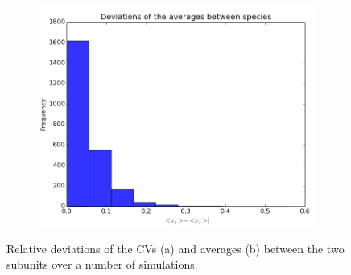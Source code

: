 \documentclass[a4paper,12pt]{article}
\begin{document}
\begin{figure}[!ht]
        \begin{subfigure}[b]{0.7\textwidth}
                \includegraphics[width=\textwidth]{images/avgs_devs}
                \caption{}
                \label{fig:devs_avgs}
        \end{subfigure}
        
\caption{Relative deviations of the CVs (a) and averages (b) between the two subunits over a number of simulations.}
\label{fig:dev_hists}
\end{figure}
\end{document}

